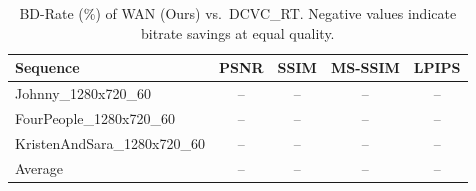 \begin{table}[t]
  \centering
  \caption{BD-Rate (\%) of WAN (Ours) vs.\ DCVC\_RT. Negative values indicate bitrate savings at equal quality.}
  \label{tab:bdrate}
  \begin{tabular}{l|cccc}
    \toprule
    Sequence & PSNR & SSIM & MS-SSIM & LPIPS \\
    \midrule
    Johnny_1280x720_60 & -- & -- & -- & -- \\
    FourPeople_1280x720_60 & -- & -- & -- & -- \\
    KristenAndSara_1280x720_60 & -- & -- & -- & -- \\
    \midrule
    Average & -- & -- & -- & -- \\
    \bottomrule
  \end{tabular}
\end{table}